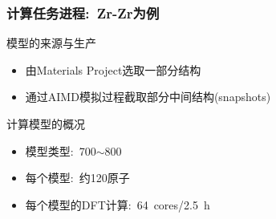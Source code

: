 \begin{frame}
	\frametitle{计算任务进程:~\textrm{Zr-Zr}为例}
	模型的来源与生产
	\begin{itemize}
		\item 由\textrm{Materials Project}选取一部分结构
		\item 通过\textrm{AIMD}模拟过程截取部分中间结构\textrm{(snapshots)}
	\end{itemize}
	计算模型的概况
	\begin{itemize}
		\item 模型类型:~\textrm{700$\sim$800}
		\item 每个模型:~约\textrm{120}原子
		\item 每个模型的\textrm{DFT}计算:~\textrm{64~cores}/\textrm{2.5~h}
	\end{itemize}
\end{frame}
